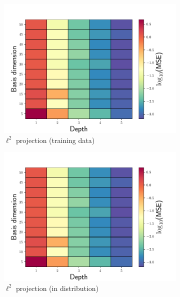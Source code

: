 \documentclass[3p,computermodern,10pt]{elsarticle}
\begin{document}
\begin{figure}
\begin{center}
\begin{subfigure}[t]{0.32\textwidth}
\includegraphics[trim={0cm 0cm 0cm 0cm},clip,width=1.0\linewidth]{code/burgers/synapse_models/basis_study/MSE_training.pdf}
\caption{$\ell^2$ projection (training data)}
\end{subfigure}
\begin{subfigure}[t]{0.32\textwidth}
\includegraphics[trim={0cm 0cm 0cm 0cm},clip,width=1.0\linewidth]{code/burgers/synapse_models/basis_study_indistribution/MSE_training.pdf}
\caption{$\ell^2$ projection (in distribution)}
\end{subfigure}
\begin{subfigure}[t]{0.32\textwidth}

\end{subfigure}
\end{center}
\end{figure}
\end{document}
